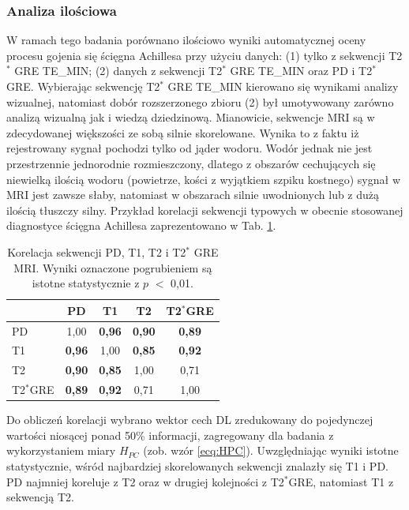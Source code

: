 \subsubsection{Analiza ilościowa} W ramach tego badania porównano ilościowo wyniki automatycznej oceny procesu gojenia się ścięgna Achillesa przy użyciu danych: (1) tylko z sekwencji \linebreak T2$^\ast$ GRE TE\_MIN; (2) danych z sekwencji T2$^\ast$ GRE TE\_MIN oraz PD i T2$^\ast$ GRE. 
Wybierając sekwencję T2$^\ast$ GRE TE\_MIN kierowano się wynikami analizy wizualnej, natomiast dobór rozszerzonego zbioru (2) był umotywowany zarówno analizą wizualną jak i wiedzą dziedzinową. Mianowicie, sekwencje MRI są w zdecydowanej większości ze sobą silnie skorelowane. Wynika to z faktu iż rejestrowany sygnał pochodzi tylko od jąder wodoru. Wodór jednak nie jest przestrzennie jednorodnie rozmieszczony, dlatego z obszarów cechujących się niewielką ilością wodoru (powietrze, kości z wyjątkiem szpiku kostnego) sygnał w MRI jest zawsze słaby, natomiast w obszarach silnie uwodnionych lub z dużą ilością tłuszczy silny. Przykład korelacji sekwencji typowych w obecnie stosowanej diagnostyce ścięgna Achillesa zaprezentowano w Tab. \ref{tab:inter-protocol-corr}.

\vspace{10px}
\renewcommand{\arraystretch}{1.2}
\begin{table}[h]
	\centering
	\setlength{\tabcolsep}{12pt}
	\caption{Korelacja sekwencji PD, T1, T2 i T2$^\ast$ GRE MRI. Wyniki oznaczone pogrubieniem są istotne statystycznie z $p$ $<$ 0,01.}
	\label{tab:inter-protocol-corr}
	\begin{tabular}{l||c|c|c|c}
		& PD & T1 & T2 & T2$^\ast$GRE \\ \hline \hline
		PD & 1,00 & \textbf{0,96} & \textbf{0,90} & \textbf{0,89} \\ \hline
		T1 & \textbf{0,96} & 1,00 & \textbf{0,85} & \textbf{0,92} \\ \hline
		T2 & \textbf{0,90} & \textbf{0,85} & 1,00 & 0,71 \\ \hline
		T2$^\ast$GRE & \textbf{0,89} & \textbf{0,92} & 0,71 & 1,00  %
	\end{tabular}
\end{table} 
\renewcommand{\arraystretch}{1}

Do obliczeń korelacji wybrano wektor cech DL zredukowany do pojedynczej wartości niosącej ponad 50\% informacji, zagregowany dla badania z wykorzystaniem miary $H_{PC}$ (zob. wzór \ref{ecq:HPC}). Uwzględniając wyniki istotne statystycznie, wśród najbardziej skorelowanych sekwencji znalazły się T1 i PD. PD najmniej koreluje \linebreak z T2 oraz w drugiej kolejności z T2$^\ast$GRE, natomiast T1 z sekwencją T2. 

